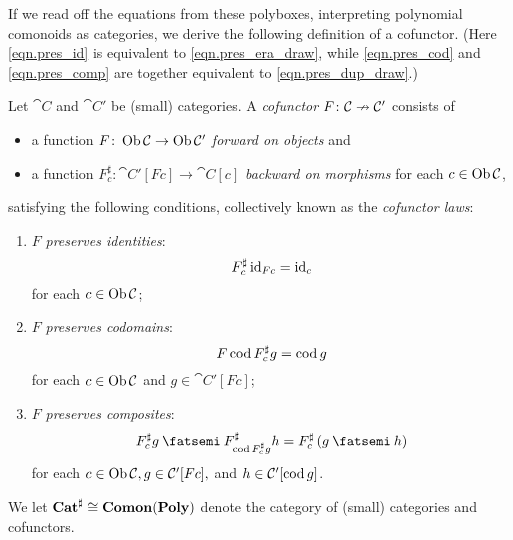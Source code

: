 \documentclass[Book-Poly]{subfiles}
\begin{document}
If we read off the equations from these polyboxes, interpreting polynomial comonoids as categories, we derive the following definition of a cofunctor.
(Here \eqref{eqn.pres_id} is equivalent to \eqref{eqn.pres_era_draw}, while \eqref{eqn.pres_cod} and \eqref{eqn.pres_comp} are together equivalent to \eqref{eqn.pres_dup_draw}.)

\begin{definition}[Cofunctor]\label{def.cofunctor}
Let $\cat{C}$ and $\cat{C'}$ be (small) categories.
A \emph{cofunctor} $F\colon\mathcal{C}\nrightarrow\mathcal{C'}$ consists of
\begin{itemize}
    \item a function $F\colon\operatorname{Ob}\mathcal{C}\to\operatorname{Ob}\mathcal{C'}$ \emph{forward on objects} and
    \item a function $F^\sharp_c\colon\cat{C'}[Fc]\to\cat{C}[c]$ \emph{backward on morphisms} for each $c\in\operatorname{Ob}\mathcal{C}$,
\end{itemize}
satisfying the following conditions, collectively known as the \emph{cofunctor laws}:
\begin{enumerate}[itemsep=0pt, label=\roman*.]
	\item $F$ \emph{preserves identities}:
	\begin{equation} \label{eqn.pres_id}
	    F^\sharp_c\,\mathrm{id}_{Fc}=\mathrm{id}_c
	\end{equation}
	for each $c\in\operatorname{Ob}\mathcal{C}$;
	\item $F$ \emph{preserves codomains}:
	\begin{equation} \label{eqn.pres_cod}
	    F\operatorname{cod} F^\sharp_c g=\operatorname{cod} g
	\end{equation}
	for each $c\in\operatorname{Ob}\mathcal{C}$ and $g\in\cat{C'}[Fc]$;
	\item $F$ \emph{preserves composites}:%
	\begin{equation} \label{eqn.pres_comp}
	    F^\sharp_c g\then F^\sharp_{\cod F^\sharp_c g} h=F^\sharp_c\left(g\then h\right)
	\end{equation}
	for each $c\in\operatorname{Ob}\mathcal{C}, g\in\mathcal{C'}[Fc],$ and $h\in\mathcal{C'}[\operatorname{cod} g]$.
\end{enumerate}
We let $\mathbf{Cat}^\sharp\cong\mathbf{Comon}(\mathbf{Poly})$ denote the category of (small) categories and cofunctors.
\end{definition}
\end{document}
